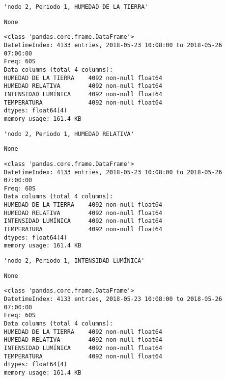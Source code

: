 \documentclass[11pt]{article}
\begin{document}
    
    \begin{verbatim}
'nodo 2, Periodo 1, HUMEDAD DE LA TIERRA'
    \end{verbatim}

    
    
    \begin{verbatim}
None
    \end{verbatim}

    
    \begin{Verbatim}[commandchars=\\\{\}]
<class 'pandas.core.frame.DataFrame'>
DatetimeIndex: 4133 entries, 2018-05-23 10:08:00 to 2018-05-26 07:00:00
Freq: 60S
Data columns (total 4 columns):
HUMEDAD DE LA TIERRA    4092 non-null float64
HUMEDAD RELATIVA        4092 non-null float64
INTENSIDAD LUMÍNICA     4092 non-null float64
TEMPERATURA             4092 non-null float64
dtypes: float64(4)
memory usage: 161.4 KB

    \end{Verbatim}

    
    \begin{verbatim}
'nodo 2, Periodo 1, HUMEDAD RELATIVA'
    \end{verbatim}

    
    
    \begin{verbatim}
None
    \end{verbatim}

    
    \begin{Verbatim}[commandchars=\\\{\}]
<class 'pandas.core.frame.DataFrame'>
DatetimeIndex: 4133 entries, 2018-05-23 10:08:00 to 2018-05-26 07:00:00
Freq: 60S
Data columns (total 4 columns):
HUMEDAD DE LA TIERRA    4092 non-null float64
HUMEDAD RELATIVA        4092 non-null float64
INTENSIDAD LUMÍNICA     4092 non-null float64
TEMPERATURA             4092 non-null float64
dtypes: float64(4)
memory usage: 161.4 KB

    \end{Verbatim}

    
    \begin{verbatim}
'nodo 2, Periodo 1, INTENSIDAD LUMÍNICA'
    \end{verbatim}

    
    
    \begin{verbatim}
None
    \end{verbatim}

    
    \begin{Verbatim}[commandchars=\\\{\}]
<class 'pandas.core.frame.DataFrame'>
DatetimeIndex: 4133 entries, 2018-05-23 10:08:00 to 2018-05-26 07:00:00
Freq: 60S
Data columns (total 4 columns):
HUMEDAD DE LA TIERRA    4092 non-null float64
HUMEDAD RELATIVA        4092 non-null float64
INTENSIDAD LUMÍNICA     4092 non-null float64
TEMPERATURA             4092 non-null float64
dtypes: float64(4)
memory usage: 161.4 KB

    \end{Verbatim}
\end{document}
